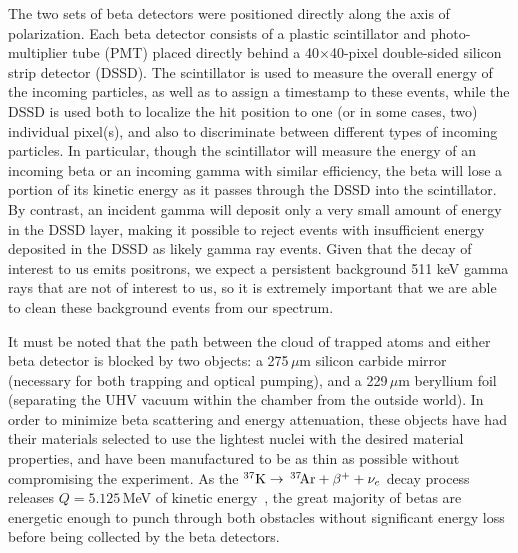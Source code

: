 	The two sets of beta detectors were positioned directly along the axis of polarization.  Each beta detector consists of a plastic scintillator and photo-multiplier tube (PMT)  placed directly behind a 40$\times$40-pixel double-sided silicon strip detector (DSSD).    The scintillator is used to measure the overall energy of the incoming particles, as well as to assign a timestamp to these events, while the DSSD is used both to localize the hit position to one (or in some cases, two) individual pixel(s), and also to discriminate between different types of incoming particles.  In particular, though the scintillator will measure the energy of an incoming beta or an incoming gamma with similar efficiency, the beta will lose a portion of its kinetic energy as it passes through the DSSD into the scintillator.  By contrast, an incident gamma will deposit only a very small amount of energy in the DSSD layer, making it possible to reject events with insufficient energy deposited in the DSSD as likely gamma ray events.  Given that the decay of interest to us emits positrons, we expect a persistent background 511 keV gamma rays that are not of interest to us, so it is extremely important that we are able to clean these background events from our spectrum. 


It must be noted that the path between the cloud of trapped atoms and either beta detector is blocked by two objects:  a 275$\,\mu$m silicon carbide mirror (necessary for both trapping and optical pumping), and a 229$\,\mu$m beryllium foil (separating the UHV vacuum within the chamber from the outside world).  In order to minimize beta scattering and energy attenuation, these objects have had their materials selected to use the lightest nuclei with the desired material properties, and have been manufactured to be as thin as possible without compromising the experiment.  As the $^{37}\textrm{K} \rightarrow \,^{37}\textrm{\!Ar} + \beta^{+} + \nu_e$ decay process releases $Q=5.125$\,MeV of kinetic energy~\cite{Q_value}, the great majority of betas are energetic enough to punch through both obstacles without significant energy loss before being collected by the beta detectors.  





